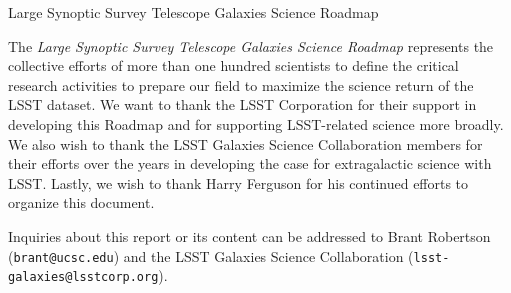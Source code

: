 \documentclass[11pt,fleqn,oneside,openany]{book}
\begin{document}



\thispagestyle{empty}
{\Huge Large Synoptic Survey Telescope} 
\linebreak 
\linebreak 
{\Huge Galaxies Science Roadmap}
\linebreak
\linebreak
{\centering

}
\vfill

\newpage
\thispagestyle{empty}

\noindent
{\justify
The {\it Large Synoptic Survey Telescope Galaxies Science Roadmap} represents the collective efforts of more than one hundred scientists to define the critical research activities to prepare our field to maximize
the science return of the LSST dataset. We want to thank the LSST Corporation for their
support in developing this Roadmap and for supporting LSST-related science more broadly.
We also wish to thank the LSST Galaxies Science Collaboration members for their efforts
over the years in developing the case for extragalactic science with LSST. Lastly, we
wish to thank Harry Ferguson for his continued efforts to organize this document.
}
\vspace{1in}

Inquiries about this report or its content can be addressed to Brant Robertson ({\tt brant@ucsc.edu}) and the LSST Galaxies Science Collaboration ({\tt lsst-galaxies@lsstcorp.org}).
\vspace{1in}







\tableofcontents %










\end{document}
